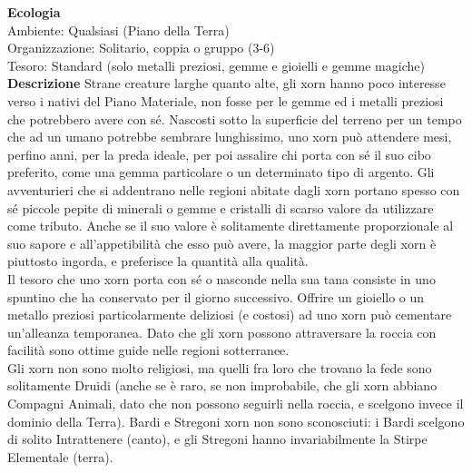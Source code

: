 \begin{multicols}{2}
\textbf{Ecologia}\\
Ambiente: Qualsiasi (Piano della Terra)\\
Organizzazione: Solitario, coppia o gruppo (3-6)\\
Tesoro: Standard (solo metalli preziosi, gemme e gioielli e gemme magiche)\\
\textbf{Descrizione}
Strane creature larghe quanto alte, gli xorn hanno poco interesse verso i nativi del Piano Materiale, non fosse per le gemme ed i metalli preziosi che potrebbero avere con sé. Nascosti sotto la superficie del terreno per un tempo che ad un umano potrebbe sembrare lunghissimo, uno xorn può attendere mesi, perfino anni, per la preda ideale, per poi assalire chi porta con sé il suo cibo preferito, come una gemma particolare o un determinato tipo di argento. Gli avventurieri che si addentrano nelle regioni abitate dagli xorn portano spesso con sé piccole pepite di minerali o gemme e cristalli di scarso valore da utilizzare come tributo. Anche se il suo valore è solitamente direttamente proporzionale al suo sapore e all'appetibilità che esso può avere, la maggior parte degli xorn è piuttosto ingorda, e preferisce la quantità alla qualità.\\

Il tesoro che uno xorn porta con sé o nasconde nella sua tana consiste in uno spuntino che ha conservato per il giorno successivo. Offrire un gioiello o un metallo preziosi particolarmente deliziosi (e costosi) ad uno xorn può cementare un'alleanza temporanea. Dato che gli xorn possono attraversare la roccia con facilità sono ottime guide nelle regioni sotterranee.\\

Gli xorn non sono molto religiosi, ma quelli fra loro che trovano la fede sono solitamente Druidi (anche se è raro, se non improbabile, che gli xorn abbiano Compagni Animali, dato che non possono seguirli nella roccia, e scelgono invece il dominio della Terra). Bardi e Stregoni xorn non sono sconosciuti: i Bardi scelgono di solito Intrattenere (canto), e gli Stregoni hanno invariabilmente la Stirpe Elementale (terra).\\


\end{multicols}
